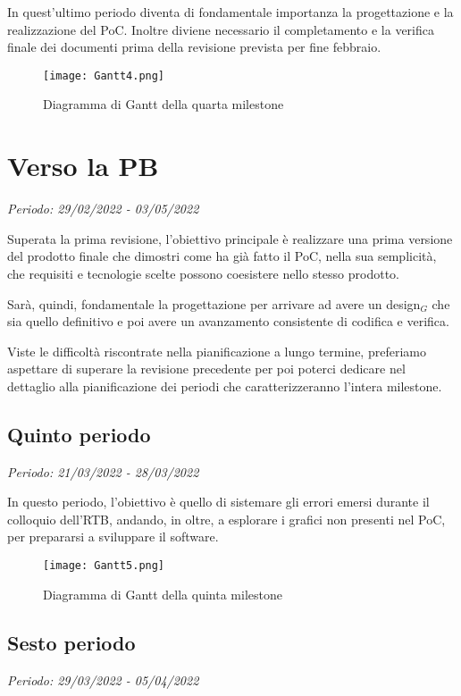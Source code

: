 In quest'ultimo periodo diventa di fondamentale importanza la progettazione e la realizzazione
 del PoC. Inoltre diviene necessario il completamento e la verifica finale dei documenti prima della revisione prevista
 per fine febbraio.


\begin{figure}[!ht]
    \texttt{[image: Gantt4.png]}
    \caption{Diagramma di Gantt della quarta milestone}
\end{figure}

\section{Verso la PB}

\textit{Periodo: 29/02/2022 - 03/05/2022}

Superata la prima revisione, l'obiettivo principale è realizzare una prima versione del prodotto finale che dimostri come ha già fatto il PoC, nella sua semplicità,
che requisiti e tecnologie scelte possono coesistere nello stesso prodotto.

Sarà, quindi, fondamentale la progettazione per arrivare ad avere un design$_G$ che sia quello definitivo e poi avere un avanzamento consistente di codifica e verifica.

Viste le difficoltà riscontrate nella pianificazione a lungo termine, preferiamo aspettare di superare la revisione precedente per poi poterci dedicare nel dettaglio
alla pianificazione dei periodi che caratterizzeranno l'intera milestone.

\subsection{Quinto periodo}
\textit{Periodo: 21/03/2022 - 28/03/2022}

In questo periodo, l'obiettivo è quello di sistemare gli errori emersi durante il colloquio dell'RTB, andando, in oltre, a esplorare i grafici non presenti nel PoC, per prepararsi a sviluppare il software.

\begin{figure}[!ht]
    \texttt{[image: Gantt5.png]}
    \caption{Diagramma di Gantt della quinta milestone}
\end{figure}

\subsection{Sesto periodo}
\textit{Periodo: 29/03/2022 - 05/04/2022}

